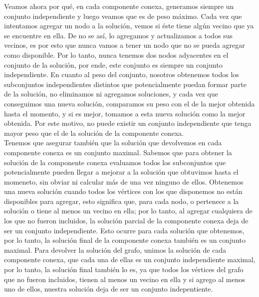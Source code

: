 \documentclass[a4paper, 10pt]{article}
\begin{document}
Veamos ahora por qu\'e, en cada componente conexa, generamos siempre un conjunto independiente y luego veamos que es de peso m\'aximo. Cada vez que intentamos agregar un nodo a la soluci\'on, vemos si \'este tiene alg\'un vecino que ya se encuentre en ella. De no se as\'i, lo agregamos y actualizamos a todos sus vecinos, es por esto que nunca vamos a tener un nodo que no se pueda agregar como disponible. Por lo tanto, nunca tenemos dos nodos adyacentes en el conjunto de la soluci\'on, por ende, este conjunto es siempre un conjunto independiente. En cuanto al peso del conjunto, nosotros obtenemos todos los subconjuntos independientes distintos que potencialmente puedan formar parte de la soluci\'on, no eliminamos ni agregamos soluciones, y cada vez que conseguimos una nueva soluci\'on, comparamos su peso con el de la mejor obtenida hasta el momento, y si es mejor, tomamos a esta nueva soluci\'on como la mejor obtenida. Por este motivo, no puede existir un conjunto independiente que tenga mayor peso que el de la soluci\'on de la componente conexa. \\

Tenemos que asegurar tambi\'en que la soluci\'on que devolvemos en cada componente conexa es un conjunto maximal. Sabemos que para obtener la soluci\'on de la componente conexa evaluamos todos los subconjuntos que potencialmente pueden llegar a mejorar a la soluci\'on que obtuvimos hasta el momeneto, sin obviar ni calcular m\'as de una vez ninguno de ellos. Obtenemos una nueva soluci\'on cuando todos los v\'ertices con los que disponemos no est\'an disponibles para agregar, esto significa que, para cada nodo, o pertenece a la soluci\'on o tiene al menos un vecino en ella; por lo tanto, al agregar cualquiera de los que no fueron incluidos, la soluci\'on parcial de la componente conexa deja de ser un conjunto independiente. Esto ocurre para cada soluci\'on que obtenemos, por lo tanto, la soluci\'on final de la componente conexa tambi\'en es un conjunto maximal. Para devolver la soluci\'on del grafo, unimos la soluci\'on de cada componente conexa, que cada una de ellas es un conjunto independiente maximal, por lo tanto, la soluci\'on final tambi\'en lo es, ya que todos los v\'ertices del grafo que no fueron incluidos, tienen al menos un vecino en ella y si agrego al menos uno de ellos, nuestra soluci\'on deja de ser un conjunto indepentiente. \\
\end{document}

